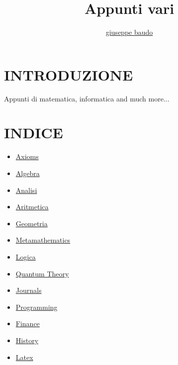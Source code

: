 \documentclass[a4paper,10pt]{article}
\title{Appunti vari}
\author{\href{http://www.baudo.hol.es}{giuseppe baudo}}
\begin{document}
\maketitle

\section{INTRODUZIONE}
Appunti di matematica, informatica and much more...

\section{INDICE}
\begin{itemize}
  \item \href{./Axioms.html}{Axioms}
  \item \href{./AlgebraIndex.html}{Algebra}
  \item \href{./Analisi.html}{Analisi} 
  \item \href{./Aritmetica.html}{Aritmetica}
  \item \href{./Geometria.html}{Geometria}
  \item \href{./Metamathematics.html}{Metamathematics}
  \item \href{./Logics.html}{Logica}
  \item \href{./QuantumTheory.html}{Quantum Theory}
  \item \href{./Journals.html}{Journals}
  \item \href{./Programming.html}{Programming}
  \item \href{./finance.html}{Finance} 
  \item \href{./history.html}{History} 
  \item \href{./latex.html}{Latex} 
  
\end{itemize}
\end{document}
